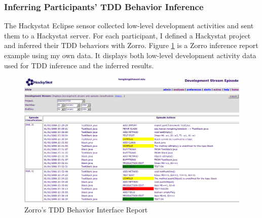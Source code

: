 \subsubsection{Inferring Participants' TDD Behavior Inference}
The Hackystat Eclipse sensor collected low-level development
activities and sent them to a Hackystat server. For each participant,
I defined a Hackystat project and inferred their TDD behaviors with
Zorro. Figure \ref{fig:gui} is a Zorro inference report example using my 
own data. It displays both low-level development activity data used 
for TDD inference and the inferred results. 
\begin{figure}[htbp]
  \centering
  \includegraphics[width=1.0\textwidth]{figs/Zorro-Gui}
  \caption{Zorro's TDD Behavior Interface Report}\label{fig:gui}
\end{figure}

